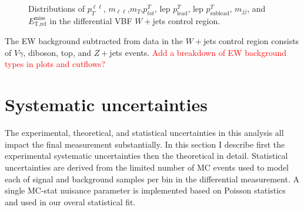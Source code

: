 \begin{figure}[!h]
{  }\hfill
  \hfill
  \hfill
{\caption{Distributions of $p_T^{\ell\ell}$, $m_{\ell\ell}$,$m_T$,$p^T_{tot}$, lep $p^T_{\text{lead}}$, lep $p^T_{\text{sublead}}$, $m_{jj}$, and $\ensuremath{E_{\text{T,rel}}^{\text{miss}}}$ in the differential VBF $W+$jets control region.
\label{fig:WCR}}}
\end{figure}  

The EW background subtracted from data in the $W+$jets control region consists of $V\gamma$, diboson, top, and $Z+$jets events. \textcolor{red}{Add a breakdown of EW background types in plots and cutflows?}

\section{Systematic uncertainties}
The experimental, theoretical, and statistical uncertainties in this analysis all impact the final measurement substantially. In this section I describe first the experimental systematic uncertainties then the theoretical in detail. Statistical uncertainties are derived from the limited number of MC events used to model each of signal and background samples per bin in the differential measurement. A single MC-stat nuisance parameter is implemented based on Poisson statistics and used in our overal statistical fit. 

